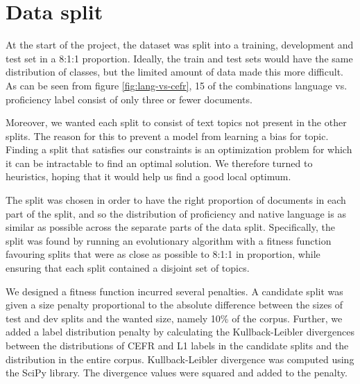 \section{Data split}

At the start of the project, the dataset was split into a training,
development and test set in a 8:1:1 proportion. Ideally, the train and test
sets would have the same distribution of classes, but the limited amount of
data made this more difficult. As can be seen from figure
\ref{fig:lang-vs-cefr}, 15 of the combinations language vs. proficiency label
consist of only three or fewer documents.

Moreover, we wanted each split to consist of text topics not present in the
other splits. The reason for this to prevent a model from learning a bias for
topic. Finding a split that satisfies our constraints is an optimization
problem for which it can be intractable to find an optimal solution. We
therefore turned to heuristics, hoping that it would help us find a good
local optimum.
 
The split was chosen in order to have the right proportion of documents in
each part of the split, and so the distribution of proficiency and native
language is as similar as possible across the separate parts of the data
split. Specifically, the split was found by running an evolutionary algorithm
with a fitness function favouring splits that were as close as possible to
8:1:1 in proportion, while ensuring that each split contained a disjoint set
of topics.

We designed a fitness function incurred several penalties. A candidate split
was given a size penalty proportional to the absolute difference between the
sizes of test and dev splits and the wanted size, namely 10\% of the corpus.
Further, we added a label distribution penalty by calculating the
Kullback-Leibler divergences between the distributions of CEFR and L1 labels
in the candidate splits and the distribution in the entire corpus.
Kullback-Leibler divergence was computed using the SciPy \autocite{scipy}
library. The divergence values were squared and added to the penalty.

